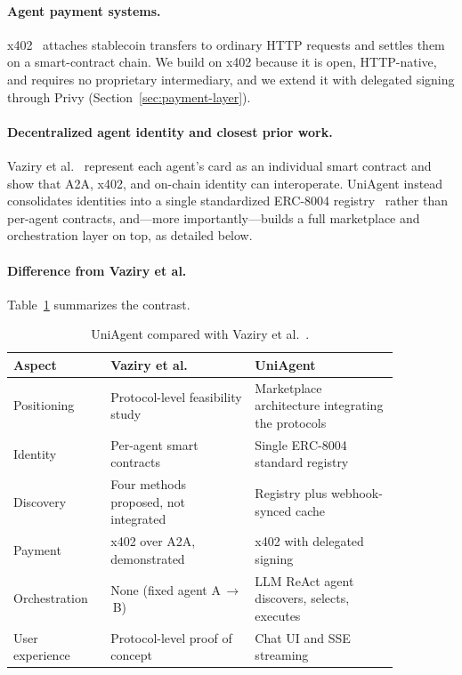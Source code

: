 \documentclass[sigconf]{acmart}
\begin{document}
\paragraph{Agent payment systems.}
x402~\cite{x402whitepaper} attaches stablecoin transfers to ordinary
HTTP requests and settles them on a smart-contract chain. We build on
x402 because it is open, HTTP-native, and requires no proprietary
intermediary, and we extend it with delegated signing through Privy
(Section~\ref{sec:payment-layer}).

\paragraph{Decentralized agent identity and closest prior work.}
Vaziry et al.~\cite{vaziry2025} represent each agent's card as an
individual smart contract and show that A2A, x402, and on-chain identity
can interoperate. UniAgent instead consolidates identities into a single
standardized ERC-8004 registry~\cite{erc8004} rather than per-agent
contracts, and---more importantly---builds a full marketplace and
orchestration layer on top, as detailed below.

\paragraph{Difference from Vaziry et al.}
Table~\ref{tab:vaziry} summarizes the contrast.

\begin{table}[H]
  \caption{UniAgent compared with Vaziry et al.~\cite{vaziry2025}.}
  \label{tab:vaziry}
  \small
  \begin{tabular}{@{}p{0.20\linewidth}p{0.33\linewidth}p{0.33\linewidth}@{}}
    \toprule
    Aspect & Vaziry et al. & UniAgent \\
    \midrule
    Positioning & Protocol-level feasibility study
      & Marketplace architecture integrating the protocols \\
    Identity & Per-agent smart contracts
      & Single ERC-8004 standard registry \\
    Discovery & Four methods proposed, not integrated
      & Registry plus webhook-synced cache \\
    Payment & x402 over A2A, demonstrated
      & x402 with delegated signing \\
    Orchestration & None (fixed agent A\,$\to$\,B)
      & LLM ReAct agent discovers, selects, executes \\
    User experience & Protocol-level proof of concept
      & Chat UI and SSE streaming \\
    \bottomrule
  \end{tabular}
\end{table}
\end{document}
